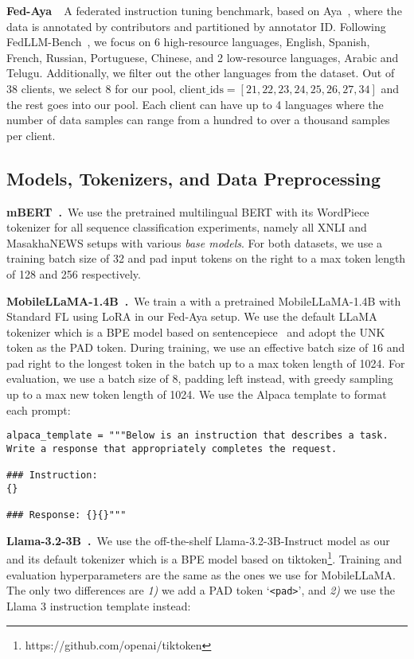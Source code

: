 \noindent\textbf{Fed-Aya~\cite{fedllm-bench}}~A federated instruction tuning benchmark, based on Aya~\cite{singh2024aya}, where the data is annotated by contributors and partitioned by annotator ID. Following FedLLM-Bench~\cite{fedllm-bench}, we focus on 6 high-resource languages, English, Spanish, French, Russian, Portuguese, Chinese, and 2 low-resource languages, Arabic and Telugu. Additionally, we filter out the other languages from the dataset. Out of 38 clients, we select 8 for our \unseen{} pool, $\text{client\_ids}=[21, 22, 23, 24, 25, 26, 27, 34]$ and the rest goes into our \seen{} pool. Each client can have up to 4 languages where the number of data samples can range from a hundred to over a thousand samples per client.

\subsection{Models, Tokenizers, and Data Preprocessing}

\noindent\textbf{mBERT~\cite{BERT}.}~We use the pretrained multilingual BERT with its WordPiece tokenizer for all sequence classification experiments, namely all XNLI and MasakhaNEWS setups with various {\em base models}. For both datasets, we use a training batch size of 32 and pad input tokens on the right to a max token length of 128 and 256 respectively.

\noindent\textbf{MobileLLaMA-1.4B~\cite{mobilellama}.}~We train a \basemodel{} with a pretrained MobileLLaMA-1.4B with Standard FL using LoRA in our Fed-Aya setup. We use the default LLaMA tokenizer which is a BPE model based on sentencepiece~\cite{Kudo2018SentencePieceAS} and adopt the UNK token as the PAD token. During training, we use an effective batch size of $16$ and pad right to the longest token in the batch up to a max token length of 1024. For evaluation, we use a batch size of 8, padding left instead, with greedy sampling up to a max new token length of 1024. We use the Alpaca template to format each prompt:

\begin{lstlisting}[linewidth=\columnwidth,breaklines=true]
alpaca_template = """Below is an instruction that describes a task. Write a response that appropriately completes the request.

### Instruction:
{} 

### Response: {}{}"""
\end{lstlisting}

\noindent\textbf{Llama-3.2-3B~\cite{llama3}.}~We use the off-the-shelf Llama-3.2-3B-Instruct model as our \basemodel{} and its default tokenizer which is a BPE model based on tiktoken\footnote{https://github.com/openai/tiktoken}. Training and evaluation hyperparameters are the same as the ones we use for MobileLLaMA. The only two differences are \textit{1)} we add a PAD token `\verb|<pad>|', and \textit{2)} we use the Llama 3 instruction template instead:

